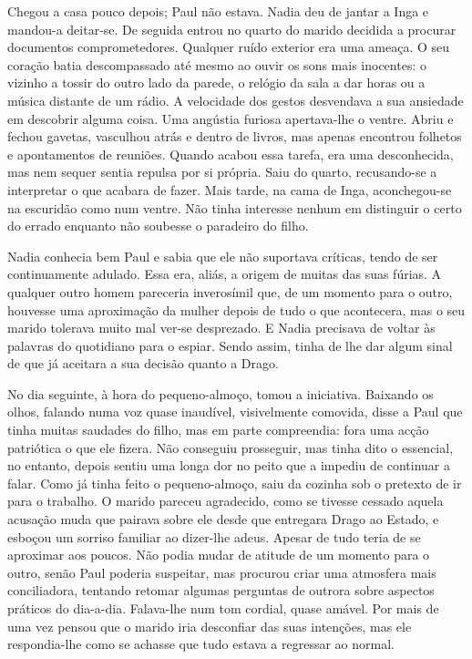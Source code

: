 Chegou a casa pouco depois; Paul não estava. Nadia deu de jantar a Inga
e mandou-a deitar-se. De seguida entrou no quarto do marido decidida a
procurar documentos comprometedores. Qualquer ruído exterior era uma
ameaça. O seu coração batia descompassado até mesmo ao ouvir os sons
mais inocentes: o vizinho a tossir do outro lado da parede, o relógio da
sala a dar horas ou a música distante de um rádio. A velocidade dos
gestos desvendava a sua ansiedade em descobrir alguma coisa. Uma
angústia furiosa apertava-lhe o ventre. Abriu e fechou gavetas,
vasculhou atrás e dentro de livros, mas apenas encontrou folhetos e
apontamentos de reuniões. Quando acabou essa tarefa, era uma
desconhecida, mas nem sequer sentia repulsa por si própria. Saiu do
quarto, recusando-se a interpretar o que acabara de fazer. Mais tarde,
na cama de Inga, aconchegou-se na escuridão como num ventre. Não tinha
interesse nenhum em distinguir o certo do errado enquanto não soubesse o
paradeiro do filho.

Nadia conhecia bem Paul e sabia que ele não suportava críticas, tendo de
ser continuamente adulado. Essa era, aliás, a origem de muitas das suas
fúrias. A qualquer outro homem pareceria inverosímil que, de um momento
para o outro, houvesse uma aproximação da mulher depois de tudo o que
acontecera, mas o seu marido tolerava muito mal ver-se desprezado. E
Nadia precisava de voltar às
palavras do quotidiano para o espiar. Sendo assim, tinha de lhe dar
algum sinal de que já aceitara a sua decisão quanto a Drago.

No dia seguinte, à hora do pequeno-almoço, tomou a iniciativa. Baixando
os olhos, falando numa voz quase inaudível, visivelmente comovida, disse
a Paul que tinha muitas saudades do filho, mas em parte compreendia:
fora uma acção patriótica o que ele fizera. Não conseguiu prosseguir,
mas tinha dito o essencial, no entanto, depois sentiu uma longa dor no
peito que a impediu de continuar a falar. Como já tinha feito o
pequeno-almoço, saiu da cozinha sob o pretexto de ir para o trabalho. O
marido pareceu agradecido, como se tivesse cessado aquela acusação muda
que pairava sobre ele desde que entregara Drago ao Estado, e esboçou um
sorriso familiar ao dizer-lhe adeus. Apesar de tudo teria de se
aproximar aos poucos. Não podia mudar de atitude de um momento para o
outro, senão Paul poderia suspeitar, mas procurou criar uma atmosfera
mais conciliadora, tentando retomar algumas perguntas de outrora sobre
aspectos práticos do dia-a-dia. Falava-lhe num tom cordial, quase
amável. Por mais de uma vez pensou que o marido iria desconfiar das suas
intenções, mas ele respondia-lhe como se achasse que tudo
estava a regressar ao normal.

